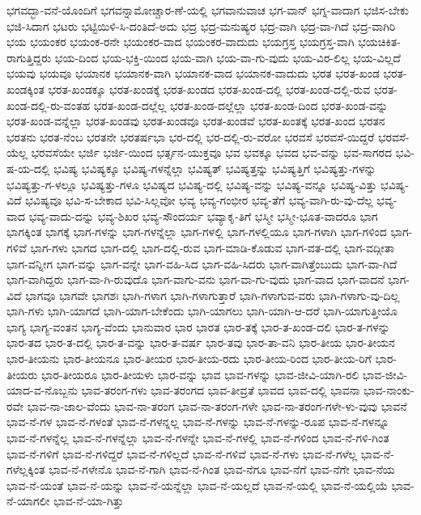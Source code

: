 {ಭಗವದ್ಭಾ-ವನೆ-ಯೊಂದಿಗೆ
ಭಗವನ್ನಾಮೋಚ್ಚಾರ-ಣೆ-ಯಲ್ಲಿ
ಭಗವಾನುವಾಚ
ಭಗ-ವಾನ್
ಭಗ್ನ-ವಾದಾಗ
ಭಜಿಸ-ಬೇಕು
ಭಜಿ-ಸಿದಾಗ
ಭಟರು
ಭಟ್ಟಿಯಿಳಿ-ಸಿ-ದಂತಿದೆ-ಅದು
ಭದ್ರ
ಭದ್ರ-ಮನುಷ್ಯರ
ಭದ್ರ-ವಾಗಿ
ಭದ್ರ-ವಾ-ಗಿದೆ
ಭದ್ರ-ವಾಗಿರಿ
ಭಯ
ಭಯಂಕರ
ಭಯಂಕ-ರನೇ
ಭಯಂಕರ-ವಾದ
ಭಯಂಕರ-ವಾದುದು
ಭಯಗ್ರಸ್ತ
ಭಯಗ್ರಸ್ತ-ವಾಗಿ
ಭಯಚಿಕಿತ-ರಾಗುತ್ತಿದ್ದರು
ಭಯ-ದಿಂದ
ಭಯ-ಭಕ್ತಿ-ಯಿಂದ
ಭಯ-ವಾಗಿ
ಭಯ-ವಾ-ಗು-ವುದು
ಭಯ-ವಿರ-ಲಿಲ್ಲ
ಭಯ-ವಿಲ್ಲದೆ
ಭಯವು
ಭಯವೂ
ಭಯಾನಕ
ಭಯಾನಕ-ವಾಗಿ
ಭಯಾನಕ-ವಾದ
ಭಯಾನಕ-ವಾದುದು
ಭರತ
ಭರತ-ಖಂಡ
ಭರತ-ಖಂಡಕ್ಕಿಂತ
ಭರತ-ಖಂಡಕ್ಕೂ
ಭರತ-ಖಂಡಕ್ಕೆ
ಭರತ-ಖಂಡದ
ಭರತ-ಖಂಡ-ದಲ್ಲಿ
ಭರತ-ಖಂಡ-ದಲ್ಲಿ-ರುವ
ಭರತ-ಖಂಡ-ದಲ್ಲಿ-ರು-ವಂತಹ
ಭರತ-ಖಂಡ-ದಲ್ಲೆಲ್ಲ
ಭರತ-ಖಂಡ-ದಲ್ಲೆಲ್ಲಾ
ಭರತ-ಖಂಡ-ದಿಂದ
ಭರತ-ಖಂಡ-ವನ್ನು
ಭರತ-ಖಂಡ-ವನ್ನೆಲ್ಲಾ
ಭರತ-ಖಂಡವು
ಭರತ-ಖಂಡವೂ
ಭರತ-ಖಂಡವೆ
ಭರತ-ಖಂತಕ್ಕೆ
ಭರತ-ಖಂದ
ಭರತನ
ಭರತನು
ಭರತ-ನೆಂಬ
ಭರತನೇ
ಭರತರ್ಷಭಾ
ಭರ-ದಲ್ಲಿ
ಭರ-ದಲ್ಲಿ-ರು-ವರೋ
ಭರವಸೆ
ಭರವಸೆ-ಯಿದ್ದರೆ
ಭರವಸೆ-ಯೆಲ್ಲ
ಭರವಸೆಯೇ
ಭರ್ಜಿ
ಭರ್ಜಿ-ಯಿಂದ
ಭರ್ತ್ಸನ-ಯುಕ್ತವೂ
ಭವ
ಭವಕ್ಕೂ
ಭವದ
ಭವ-ವನ್ನು
ಭವ-ಸಾಗರದ
ಭವಿ-ಷ-ಯ-ದಲ್ಲಿ
ಭವಿಷ್ಯ
ಭವಿಷ್ಯಕ್ಕೂ
ಭವಿಷ್ಯ-ಗಳನ್ನೆಲ್ಲಾ
ಭವಿಷ್ಯತ್
ಭವಿಷ್ಯತ್ತನ್ನು
ಭವಿಷ್ಯತ್ತಿಗೆ
ಭವಿಷ್ಯತ್ತು-ಗಳನ್ನು
ಭವಿಷ್ಯತ್ತು-ಗ-ಳಲ್ಲೂ
ಭವಿಷ್ಯತ್ತು-ಗಳೂ
ಭವಿಷ್ಯದ
ಭವಿಷ್ಯ-ದಲ್ಲಿ
ಭವಿಷ್ಯ-ವನ್ನು
ಭವಿಷ್ಯ-ವನ್ನೂ
ಭವಿಷ್ಯ-ವಿತ್ತು
ಭವಿಷ್ಯ-ವಿದೆ
ಭವಿಷ್ಯವೂ
ಭವಿ-ಸ-ಬೇಕಾದ
ಭವಿ-ಸಿಲ್ಲವೋ
ಭವ್ಯ
ಭವ್ಯ-ಗಂಭೀರ
ಭವ್ಯ-ತೆಗೆ
ಭವ್ಯ-ವಾಗಿ-ರು-ವು-ದೆಲ್ಲ
ಭವ್ಯ-ವಾದ
ಭವ್ಯ-ವಾದು-ದನ್ನು
ಭವ್ಯ-ಶಿಖರ
ಭವ್ಯ-ಸೌಂದರ್ಯ
ಭವ್ಯಾಕೃ-ತಿಗೆ
ಭಸ್ಮೀ
ಭಸ್ಮೀ-ಭೂತ-ವಾದರೂ
ಭಾಗ
ಭಾಗಕ್ಕಿಂತ
ಭಾಗಕ್ಕೆ
ಭಾಗ-ಗಳನ್ನು
ಭಾಗ-ಗಳನ್ನೆಲ್ಲಾ
ಭಾಗ-ಗಳಲ್ಲಿ
ಭಾಗ-ಗಳಲ್ಲಿಯೂ
ಭಾಗ-ಗಳಾಗಿ
ಭಾಗ-ಗಳಿಂದ
ಭಾಗ-ಗಳಿವೆ
ಭಾಗ-ಗಳು
ಭಾಗದ
ಭಾಗ-ದಲ್ಲಿ
ಭಾಗ-ದಲ್ಲಿ-ರುವ
ಭಾಗ-ಮಾಡಿ-ಕೊಡುವ
ಭಾಗ-ವತ-ದಲ್ಲಿ
ಭಾಗ-ವದ್ಗೀತಾ
ಭಾಗ-ವನ್ನೀಗ
ಭಾಗ-ವನ್ನು
ಭಾಗ-ವನ್ನೇ
ಭಾಗ-ವಹಿ-ಸಿದ
ಭಾಗ-ವಹಿ-ಸಿದರು
ಭಾಗ-ವಾಗಿತ್ತೆಂಬುದು
ಭಾಗ-ವಾ-ಗಿದೆ
ಭಾಗ-ವಾಗಿದ್ದರು
ಭಾಗ-ವಾ-ಗಿ-ರುವುದೊ
ಭಾಗ-ವಾಗು-ವನು
ಭಾಗ-ವಾ-ಗು-ವುದು
ಭಾಗ-ವಾದ
ಭಾಗ-ವಾದನೆ
ಭಾಗ-ವಿದೆ
ಭಾಗವೂ
ಭಾಗವೇ
ಭಾಗಶಃ
ಭಾಗಿ-ಗಳಾಗ
ಭಾಗಿ-ಗಳಾಗುತ್ತಾರೆ
ಭಾಗಿ-ಗಳಾಗುವ-ವರು
ಭಾಗಿ-ಗಳಾಗು-ವು-ದಿಲ್ಲ
ಭಾಗಿ-ಗಳು
ಭಾಗಿ-ಯಾಗದೆ
ಭಾಗಿ-ಯಾಗ-ಬೇಕೆಂದು
ಭಾಗಿ-ಯಾಗಲು
ಭಾಗಿ-ಯಾಗಿ-ಆ-ದರೆ
ಭಾಗಿ-ಯಾಗುತ್ತೀಯೊ
ಭಾಗ್ಯ
ಭಾಗ್ಯ-ವಂತನ
ಭಾಗ್ಯ-ವೆಂದು
ಭಾನುವಾರ
ಭಾರ
ಭಾರತ
ಭಾರ-ತಕ್ಕೆ
ಭಾರ-ತ-ಖಂಡ-ದಲಿ
ಭಾರ-ತ-ಗಳನ್ನು
ಭಾರ-ತದ
ಭಾರ-ತ-ದಲ್ಲಿ
ಭಾರ-ತ-ವನ್ನು
ಭಾರ-ತ-ವರ್ಷ
ಭಾರ-ತವು
ಭಾರ-ತಾ-ವನಿ
ಭಾರ-ತೀಯ
ಭಾರ-ತೀಯನ
ಭಾರ-ತೀಯನು
ಭಾರ-ತೀಯನೂ
ಭಾರ-ತೀಯರ
ಭಾರ-ತೀಯ-ರದು
ಭಾರ-ತೀಯ-ರಿಂದ
ಭಾರ-ತೀಯ-ರಿಗೆ
ಭಾರ-ತೀಯರು
ಭಾರ-ತೀಯರೂ
ಭಾರ-ತೀಯಳು
ಭಾರ-ವನ್ನು
ಭಾವ
ಭಾವ-ಗಳನ್ನು
ಭಾವ-ಜೀವಿ-ಯಾಗಿ-ರಲಿ
ಭಾವ-ಜೀವಿ-ಯಾದ-ವ-ನೊಬ್ಬನು
ಭಾವ-ತರಂಗ-ಗಳು
ಭಾವ-ತರಂಗದ
ಭಾವ-ತೀವ್ರತೆ
ಭಾವದ
ಭಾವ-ದಲ್ಲಿ
ಭಾವನಾ
ಭಾವ-ನಾಂಕು-ರವೇ
ಭಾವ-ನಾ-ಜಾಲ-ವೆಂದು
ಭಾವ-ನಾ-ತರಂಗ
ಭಾವ-ನಾ-ತರಂಗ-ಗಳೇ
ಭಾವ-ನಾ-ತರಂಗ-ಗಳೇ-ಳು-ವುವು
ಭಾವನೆ
ಭಾವ-ನೆ-ಗಳ
ಭಾವ-ನೆ-ಗಳಂತೆ
ಭಾವ-ನೆ-ಗಳನ್ನಲ್ಲ
ಭಾವ-ನೆ-ಗಳನ್ನು
ಭಾವ-ನೆ-ಗಳನ್ನು-ರೂಪ
ಭಾವ-ನೆ-ಗಳನ್ನೂ
ಭಾವ-ನೆ-ಗಳನ್ನೆಲ್ಲ
ಭಾವ-ನೆ-ಗಳನ್ನೆಲ್ಲಾ
ಭಾವ-ನೆ-ಗಳನ್ನೇ
ಭಾವ-ನೆ-ಗಳಲ್ಲಿ
ಭಾವ-ನೆ-ಗಳಿಂದ
ಭಾವ-ನೆ-ಗಳಿ-ಗಿಂತ
ಭಾವ-ನೆ-ಗಳಿಗೆ
ಭಾವ-ನೆ-ಗಳಿದ್ದರೆ
ಭಾವ-ನೆ-ಗಳಿಲ್ಲದೆ
ಭಾವ-ನೆ-ಗಳಿವೆ
ಭಾವ-ನೆ-ಗಳು
ಭಾವ-ನೆ-ಗಳೆಲ್ಲ
ಭಾವ-ನೆ-ಗಳೆಲ್ಲಕ್ಕಿಂತ
ಭಾವ-ನೆ-ಗಳೇನೊ
ಭಾವ-ನೆ-ಗಾಗಿ
ಭಾವ-ನೆ-ಗಿಂತ
ಭಾವ-ನೆಗೂ
ಭಾವ-ನೆಗೆ
ಭಾವ-ನೆಗೇ
ಭಾವ-ನೆಯ
ಭಾವ-ನೆ-ಯಂತೆ
ಭಾವ-ನೆ-ಯನ್ನು
ಭಾವ-ನೆ-ಯನ್ನೆಲ್ಲಾ
ಭಾವ-ನೆ-ಯಲ್ಲದೆ
ಭಾವ-ನೆ-ಯಲ್ಲಿ
ಭಾವ-ನೆ-ಯಲ್ಲಿಯೆ
ಭಾವ-ನೆ-ಯಾಗಲೀ
ಭಾವ-ನೆ-ಯಾ-ಗಿತ್ತು
}
